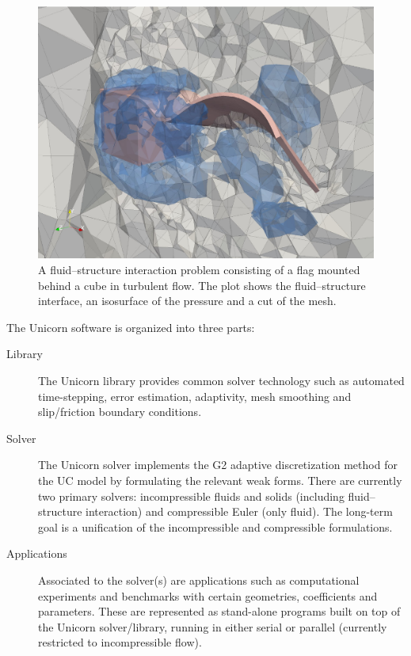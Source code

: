 \begin{figure}
  \centering
  \includegraphics[width=\largefig]{chapters/hoffman-2/pdf/cube556.pdf}
  \caption{A fluid--structure interaction problem consisting of a flag
    mounted behind a cube in turbulent flow. The plot shows the
    fluid--structure interface, an isosurface of the pressure and a
    cut of the mesh.}
  \label{fig:flag3D}
\end{figure}

The Unicorn software is organized into three parts:
\begin{description}
\item[Library] The Unicorn library provides common solver technology
  such as automated time-stepping, error estimation, adaptivity, mesh
  smoothing and slip/friction boundary conditions.

\item[Solver] The Unicorn solver implements the G2 adaptive
  discretization method for the UC model by formulating the relevant
  weak forms. There are currently two primary solvers: incompressible
  fluids and solids (including fluid--structure interaction) and
  compressible Euler (only fluid). The long-term goal is a
  unification of the incompressible and compressible formulations.

\item[Applications] Associated to the solver(s) are applications such
  as computational experiments and benchmarks with certain geometries,
  coefficients and parameters. These are represented as stand-alone
  programs built on top of the Unicorn solver/library, running in
  either serial or parallel (currently restricted to incompressible
  flow).
\end{description}

